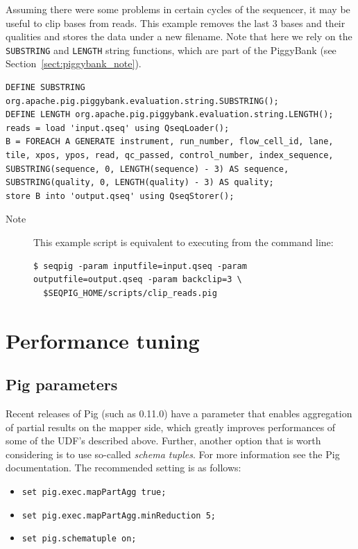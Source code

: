 Assuming there were some problems in certain cycles of the sequencer,
it may be useful to clip bases from reads. This example removes the
last 3 bases and their qualities and stores the data under a new
filename. Note that here we rely on the {\tt SUBSTRING} and {\tt LENGTH}
string functions, which are part of the PiggyBank (see
Section~\ref{sect:piggybank_note}).

\begin{lstlisting}
DEFINE SUBSTRING org.apache.pig.piggybank.evaluation.string.SUBSTRING();
DEFINE LENGTH org.apache.pig.piggybank.evaluation.string.LENGTH();
reads = load 'input.qseq' using QseqLoader();
B = FOREACH A GENERATE instrument, run_number, flow_cell_id, lane, tile, xpos, ypos, read, qc_passed, control_number, index_sequence, SUBSTRING(sequence, 0, LENGTH(sequence) - 3) AS sequence, SUBSTRING(quality, 0, LENGTH(quality) - 3) AS quality;
store B into 'output.qseq' using QseqStorer();
\end{lstlisting}
\begin{description}
	\item[Note] This example script is equivalent to executing from the command line:
\begin{lstlisting}
$ seqpig -param inputfile=input.qseq -param outputfile=output.qseq -param backclip=3 \
  $SEQPIG_HOME/scripts/clip_reads.pig
\end{lstlisting}
\end{description}

\section{Performance tuning}

\subsection{Pig parameters}

Recent releases of Pig (such as 0.11.0) have a parameter that enables
aggregation of partial results on the mapper side, which greatly
improves performances of some of the UDF's described above. Further,
another option that is worth considering is to use so-called
\emph{schema tuples}. For more information see the Pig
documentation. The recommended setting is as follows:
\begin{itemize}
\item {\tt set pig.exec.mapPartAgg true;}
\item {\tt set pig.exec.mapPartAgg.minReduction 5;}
\item {\tt set pig.schematuple on;}
\end{itemize}


